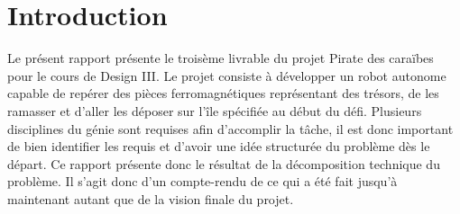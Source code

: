 \chapter{Introduction}
Le présent rapport présente le troisème livrable du projet Pirate des caraïbes pour le cours de Design III.
Le projet consiste à développer un robot autonome capable de repérer des pièces ferromagnétiques représentant des trésors,
de les ramasser et d'aller les déposer sur l'île spécifiée au début du défi. Plusieurs disciplines du génie sont requises afin d'accomplir la tâche,
il est donc important de bien identifier les requis et d'avoir une idée structurée du problème dès le départ. Ce rapport présente donc le résultat de la décomposition technique du problème.
Il s'agit donc d'un compte-rendu de ce qui a été fait jusqu'à maintenant autant que de la vision finale du projet.
